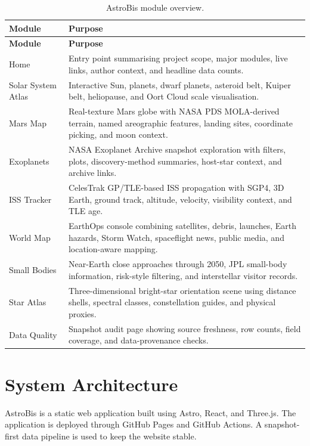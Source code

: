 \documentclass[11pt,a4paper]{article}
\begin{document}
\begin{longtable}{p{}p{}}
\caption{AstroBis module overview.}
\label{tab:modules}\\
\toprule
\textbf{Module} & \textbf{Purpose}\\
\midrule
\endfirsthead
\toprule
\textbf{Module} & \textbf{Purpose}\\
\midrule
\endhead
Home & Entry point summarising project scope, major modules, live links, author context, and headline data counts.\\
Solar System Atlas & Interactive Sun, planets, dwarf planets, asteroid belt, Kuiper belt, heliopause, and Oort Cloud scale visualisation.\\
Mars Map & Real-texture Mars globe with NASA PDS MOLA-derived terrain, named areographic features, landing sites, coordinate picking, and moon context.\\
Exoplanets & NASA Exoplanet Archive snapshot exploration with filters, plots, discovery-method summaries, host-star context, and archive links.\\
ISS Tracker & CelesTrak GP/TLE-based ISS propagation with SGP4, 3D Earth, ground track, altitude, velocity, visibility context, and TLE age.\\
World Map & EarthOps console combining satellites, debris, launches, Earth hazards, Storm Watch, spaceflight news, public media, and location-aware mapping.\\
Small Bodies & Near-Earth close approaches through 2050, JPL small-body information, risk-style filtering, and interstellar visitor records.\\
Star Atlas & Three-dimensional bright-star orientation scene using distance shells, spectral classes, constellation guides, and physical proxies.\\
Data Quality & Snapshot audit page showing source freshness, row counts, field coverage, and data-provenance checks.\\
\bottomrule
\end{longtable}

\section{System Architecture}

AstroBis is a static web application built using Astro, React, and Three.js. The application is deployed through GitHub Pages and GitHub Actions. A snapshot-first data pipeline is used to keep the website stable.
\end{document}
